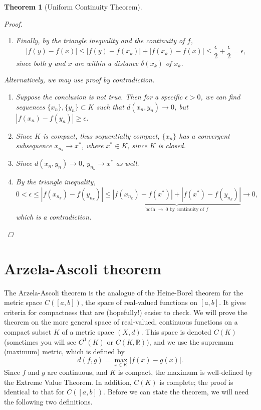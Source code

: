 \documentclass[12pt]{amsart}         %
\newtheorem{theorem}{Theorem}[section]
\theoremstyle{remark}
\newcommand{\R}{\mathbb{R}}
\begin{document}
\begin{theorem}[Uniform Continuity Theorem]
\begin{proof}
\begin{enumerate}
    \item Finally, by the triangle inequality and the continuity of $f$,
    \[
    |f(y) - f(x)| \leq |f(y) - f(x_k)| + |f(x_k) - f(x)|
    \leq \frac{\epsilon}{2} + \frac{\epsilon}{2} = \epsilon,
    \]
    since both $y$ and $x$ are within a distance $\delta(x_k)$ of $x_k$.
\end{enumerate}
Alternatively, we may use proof by contradiction.
\begin{enumerate}
    \item Suppose the conclusion is not true. Then for a specific $\epsilon > 0$, we can find sequences $\{x_n\}, \{y_n\} \subset K$ such that $d(x_n, y_n) \rightarrow 0$, but $|f(x_n) - f(y_n)| \geq \epsilon$.
    \item Since $K$ is compact, thus sequentially compact, $\{x_n\}$ has a convergent subsequence $x_{n_k} \rightarrow x^*$, where $x^* \in K$, since $K$ is closed.
    \item Since $d(x_n, y_n) \rightarrow 0$, $y_{n_k} \rightarrow x^*$ as well.
    \item By the triangle inequality,
    \[
    0 < \epsilon \leq |f(x_{n_k}) - f(y_{n_k})|
    \leq \underbrace{|f(x_{n_k}) - f(x^*)| + |f(x^*) - f(y_{n_k})|}_{\text{both  }\rightarrow\:0\text{ by continuity of }f} \rightarrow 0,
    \]
    which is a contradiction.
\end{enumerate}
\end{proof}
\end{theorem}

\section{Arzela-Ascoli theorem}

The Arzela-Ascoli theorem is the analogue of the Heine-Borel theorem for the metric space $C([a,b])$, the space of real-valued functions on $[a,b]$. It gives criteria for compactness that are (hopefully!) easier to check. We will prove the theorem on the more general space of real-valued, continuous functions on a compact subset $K$ of a metric space $(X,d)$. This space is denoted $C(K)$ (sometimes you will see $C^0(K)$ or $C(K, \R)$), and we use the supremum (maximum) metric, which is defined by
\[
d(f, g) = \max_{x \in K}|f(x) - g(x)|.
\]
Since $f$ and $g$ are continuous, and $K$ is compact, the maximum is well-defined by the Extreme Value Theorem. In addition, $C(K)$ is complete; the proof is identical to that for $C([a,b])$. Before we can state the theorem, we will need the following two definitions.
\end{document}
